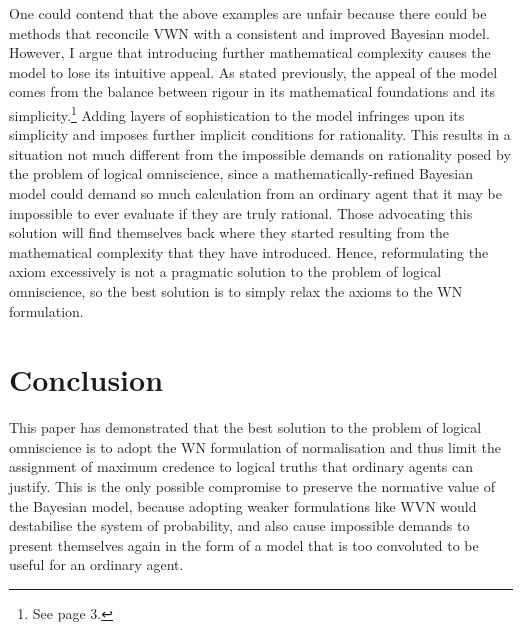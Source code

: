 \documentclass[12pt]{article}
\begin{document}
One could contend that the above examples are unfair because there could be methods that reconcile VWN with a consistent and improved Bayesian model. However, I argue that introducing further mathematical complexity causes the model to lose its intuitive appeal. As stated previously, the appeal of the model comes from the balance between rigour in its mathematical foundations and its simplicity.\footnote{See page 3.} Adding layers of sophistication to the model infringes upon its simplicity and imposes further implicit conditions for rationality. This results in a situation not much different from the impossible demands on rationality posed by the problem of logical omniscience, since a mathematically-refined Bayesian model could demand so much calculation from an ordinary agent that it may be impossible to ever evaluate if they are truly rational. Those advocating this solution will find themselves back where they started resulting from the mathematical complexity that they have introduced. Hence, reformulating the axiom excessively is not a pragmatic solution to the problem of logical omniscience, so the best solution is to simply relax the axioms to the WN formulation.
\section{Conclusion}
This paper has demonstrated that the best solution to the problem of logical omniscience is to adopt the WN formulation of normalisation and thus limit the assignment of maximum credence to logical truths that ordinary agents can justify. This is the only possible compromise to preserve the normative value of the Bayesian model, because adopting weaker formulations like WVN would destabilise the system of probability, and also cause impossible demands to present themselves again in the form of a model that is too convoluted to be useful for an ordinary agent.
\pagebreak
\printbibliography
\end{document}

